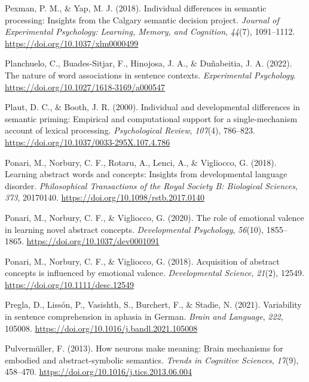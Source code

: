 \documentclass[
  12pt,
  man,floatsintext]{apa7}
\newlength{\cslhangindent}
\newlength{\cslentryspacingunit} %
\newenvironment{CSLReferences}[2] %
 {%
  \setlength{\parindent}{0pt}
  \ifodd #1
  \let\oldpar\par
  \def\par{\hangindent=\cslhangindent\oldpar}
  \fi
  \setlength{\parskip}{#2\cslentryspacingunit}
 }%
 {}
\begin{document}
\begin{CSLReferences}{1}{0}
\leavevmode{}%
Pexman, P. M., \& Yap, M. J. (2018). Individual differences in semantic processing: {Insights} from the {Calgary} semantic decision project. \emph{Journal of Experimental Psychology: Learning, Memory, and Cognition}, \emph{44}(7), 1091--1112. \url{https://doi.org/10.1037/xlm0000499}

\leavevmode{}%
Planchuelo, C., Buades-Sitjar, F., Hinojosa, J. A., \& Duñabeitia, J. A. (2022). The nature of word associations in sentence contexts. \emph{Experimental Psychology}. \url{https://doi.org/10.1027/1618-3169/a000547}

\leavevmode{}%
Plaut, D. C., \& Booth, J. R. (2000). Individual and developmental differences in semantic priming: {Empirical} and computational support for a single-mechanism account of lexical processing. \emph{Psychological Review}, \emph{107}(4), 786--823. \url{https://doi.org/10.1037/0033-295X.107.4.786}

\leavevmode{}%
Ponari, M., Norbury, C. F., Rotaru, A., Lenci, A., \& Vigliocco, G. (2018). Learning abstract words and concepts: {Insights} from developmental language disorder. \emph{Philosophical Transactions of the Royal Society B: Biological Sciences}, \emph{373}, 20170140. \url{https://doi.org/10.1098/rstb.2017.0140}

\leavevmode{}%
Ponari, M., Norbury, C. F., \& Vigliocco, G. (2020). The role of emotional valence in learning novel abstract concepts. \emph{Developmental Psychology}, \emph{56}(10), 1855--1865. \url{https://doi.org/10.1037/dev0001091}

\leavevmode{}%
Ponari, M., Norbury, C. F., \& Vigliocco, G. (2018). Acquisition of abstract concepts is influenced by emotional valence. \emph{Developmental Science}, \emph{21}(2), 12549. \url{https://doi.org/10.1111/desc.12549}

\leavevmode{}%
Pregla, D., Lissón, P., Vasishth, S., Burchert, F., \& Stadie, N. (2021). Variability in sentence comprehension in aphasia in {German}. \emph{Brain and Language}, \emph{222}, 105008. \url{https://doi.org/10.1016/j.bandl.2021.105008}

\leavevmode{}%
Pulvermüller, F. (2013). How neurons make meaning: {Brain} mechanisms for embodied and abstract-symbolic semantics. \emph{Trends in Cognitive Sciences}, \emph{17}(9), 458--470. \url{https://doi.org/10.1016/j.tics.2013.06.004}


\end{CSLReferences}
\end{document}
